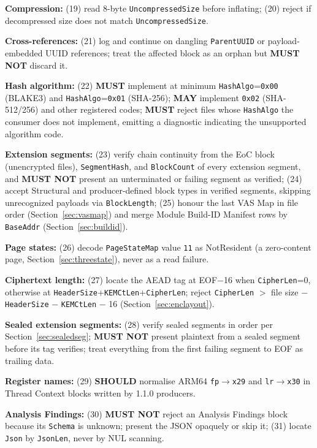 \documentclass[11pt,a4paper]{article}
\newcommand{\MUST}{\textbf{MUST}}
\newcommand{\MUSTNOT}{\textbf{MUST NOT}}
\newcommand{\SHOULD}{\textbf{SHOULD}}
\newcommand{\MAY}{\textbf{MAY}}
\newcommand{\hex}[1]{\texttt{0x#1}}
\newcommand{\field}[1]{\texttt{#1}}
\begin{document}
\noindent\textbf{Compression:} (19) read 8-byte \field{UncompressedSize} before inflating; (20) reject if decompressed size does not match \field{UncompressedSize}.

\noindent\textbf{Cross-references:} (21) log and continue on dangling \field{ParentUUID} or payload-embedded UUID references; treat the affected block as an orphan but \MUSTNOT{} discard it.

\noindent\textbf{Hash algorithm:} (22) \MUST{} implement at minimum \field{HashAlgo}={}\allowbreak\hex{00} (BLAKE3) and \field{HashAlgo}={}\allowbreak\hex{01} (SHA-256); \MAY{} implement \hex{02} (SHA-512/256) and other registered codes; \MUST{} reject files whose \field{HashAlgo} the consumer does not implement, emitting a diagnostic indicating the unsupported algorithm code.

\noindent\textbf{Extension segments:} (23) verify chain continuity from the EoC block (unencrypted files), \field{SegmentHash}, and \field{BlockCount} of every extension segment, and \MUSTNOT{} present an unterminated or failing segment as verified; (24) accept Structural and producer-defined block types in verified segments, skipping unrecognized payloads via \field{BlockLength}; (25) honour the last VAS Map in file order (Section~\ref{sec:vasmap}) and merge Module Build-ID Manifest rows by \field{BaseAddr} (Section~\ref{sec:buildid}).

\noindent\textbf{Page states:} (26) decode \field{PageStateMap} value \texttt{11} as NotResident (a zero-content page, Section~\ref{sec:threestate}), never as a read failure.

\noindent\textbf{Ciphertext length:} (27) locate the AEAD tag at EOF$-$16 when \field{CipherLen}=0, otherwise at \field{HeaderSize}+\field{KEMCtLen}+\field{CipherLen}; reject \field{CipherLen} $>$ file size $-$ \field{HeaderSize} $-$ \field{KEMCtLen} $-$ 16 (Section~\ref{sec:enclayout}).

\noindent\textbf{Sealed extension segments:} (28) verify sealed segments in order per Section~\ref{sec:sealedseg}; \MUSTNOT{} present plaintext from a sealed segment before its tag verifies; treat everything from the first failing segment to EOF as trailing data.

\noindent\textbf{Register names:} (29) \SHOULD{} normalise ARM64 \texttt{fp}$\to$\texttt{x29} and \texttt{lr}$\to$\texttt{x30} in Thread Context blocks written by 1.1.0 producers.

\noindent\textbf{Analysis Findings:} (30) \MUSTNOT{} reject an Analysis Findings block because its \field{Schema} is unknown; present the JSON opaquely or skip it; (31) locate \field{Json} by \field{JsonLen}, never by NUL scanning.
\end{document}
